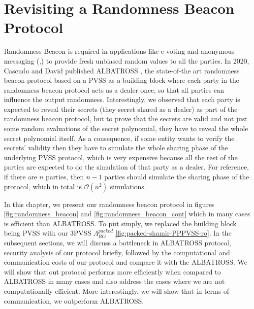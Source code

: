 \chapter{Revisiting a Randomness Beacon Protocol}
\label{cha:n}

Randomness Beacon \cite{RABIN1983256} is required in applications like e-voting \cite{10.5555/1496711.1496734} 
and anonymous messaging (\cite{180263},\cite{10.1145/2815400.2815417}) to provide fresh unbiased random values to all the 
parties. In 2020, Cascudo and David published ALBATROSS \cite{cryptoeprint:2020/644}, the state-of-the art randomness 
beacon protocol based on a PVSS as a building block where each party in the randomness beacon protocol acts as a dealer once, so that all 
parties can influence the output randomness. Interestingly, we observed that each party is expected to reveal 
their secrets (they secret shared as a dealer) as part of the randomness beacon protocol, but to prove that the 
secrets are valid and not just some random evaluations of the secret polynomial, they have to reveal the whole 
secret polynomial itself. As a consequence, if some entity wants to verify the secrets' validity then they have to 
simulate the whole sharing phase of the underlying PVSS protocol, which is very expensive because all the rest of the 
parties are expected to do the simulation of that party as a dealer. For reference, if there are $n$ parties, then 
$n-1$ parties should simulate the sharing phase of the protocol, which in total is $\mathcal{O}(n^2)$ simulations.\par

In this chapter, we present our randomness beacon protocol in figures \ref{fig:randomness_beacon} and \ref{fig:randomness_beacon_cont} 
which in many cases is efficient than ALBATROSS. To put simply, we replaced the building block being PVSS with 
our 3PVSS $\Lambda_{RO}^{packed}$ \ref{fig:packed-shamir-PPPVSS-ro}. In the subsequent sections, we will discuss a 
bottleneck in ALBATROSS protocol, security 
analysis of our protocol briefly, followed by the 
computational and communication costs of our protocol and compare it with the ALBATROSS. We will show that out protocol 
performs more efficiently when compared to ALBATROSS in many cases and also address the cases where we are not computationally efficient.
More interestingly, we will show that in terms of communication, we outperform ALBATROSS.




